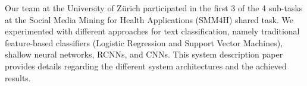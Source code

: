Our team at the University of Zürich participated in the first 3 of the 4 sub-tasks at the Social Media Mining for Health Applications (SMM4H) shared task. We experimented with different approaches for text classification, namely traditional feature-based classifiers (Logistic Regression and Support Vector Machines), shallow neural networks, RCNNs, and CNNs. This system description paper provides details regarding the different system architectures and the achieved results.
